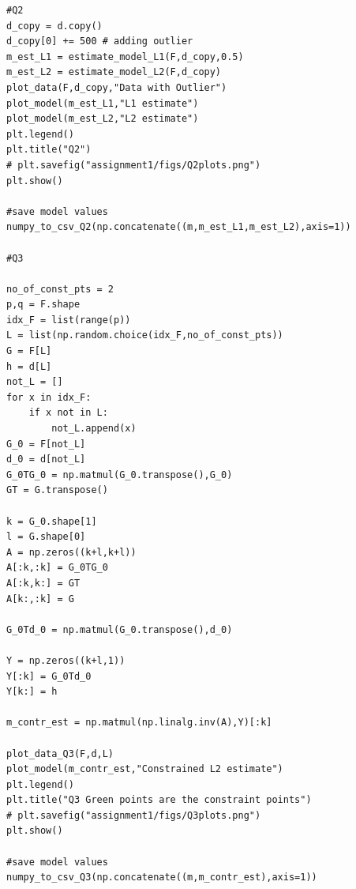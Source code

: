\documentclass{article}
\begin{document}
\begin{verbatim}
#Q2
d_copy = d.copy()
d_copy[0] += 500 # adding outlier
m_est_L1 = estimate_model_L1(F,d_copy,0.5)
m_est_L2 = estimate_model_L2(F,d_copy)
plot_data(F,d_copy,"Data with Outlier")
plot_model(m_est_L1,"L1 estimate")
plot_model(m_est_L2,"L2 estimate")
plt.legend()
plt.title("Q2")
# plt.savefig("assignment1/figs/Q2plots.png")
plt.show()

#save model values
numpy_to_csv_Q2(np.concatenate((m,m_est_L1,m_est_L2),axis=1))

#Q3

no_of_const_pts = 2
p,q = F.shape
idx_F = list(range(p))
L = list(np.random.choice(idx_F,no_of_const_pts))
G = F[L]
h = d[L]
not_L = []
for x in idx_F:
    if x not in L:
        not_L.append(x)
G_0 = F[not_L]
d_0 = d[not_L]
G_0TG_0 = np.matmul(G_0.transpose(),G_0)
GT = G.transpose()

k = G_0.shape[1]
l = G.shape[0]
A = np.zeros((k+l,k+l))
A[:k,:k] = G_0TG_0
A[:k,k:] = GT
A[k:,:k] = G

G_0Td_0 = np.matmul(G_0.transpose(),d_0)

Y = np.zeros((k+l,1))
Y[:k] = G_0Td_0
Y[k:] = h

m_contr_est = np.matmul(np.linalg.inv(A),Y)[:k]

plot_data_Q3(F,d,L)
plot_model(m_contr_est,"Constrained L2 estimate")
plt.legend()
plt.title("Q3 Green points are the constraint points")
# plt.savefig("assignment1/figs/Q3plots.png")
plt.show()

#save model values
numpy_to_csv_Q3(np.concatenate((m,m_contr_est),axis=1))





\end{verbatim}
\end{document}
